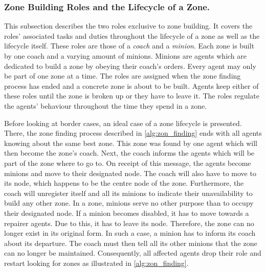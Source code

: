 \subsubsection{Zone Building Roles and the Lifecycle of a Zone.}\label{alg:zon_roles}
This subsection describes the two roles exclusive to zone building. It covers the roles' associated tasks and duties throughout the lifecycle of a zone as well as the lifecycle itself. These roles are those of a \emph{coach} and a \emph{minion}. Each zone is built by one coach and a varying amount of minions. Minions are agents which are dedicated to build a zone by obeying their coach's orders. Every agent may only be part of one zone at a time. %
The roles are assigned when the zone finding process has ended and a concrete zone is about to be built. Agents keep either of these roles until the zone is broken up or they have to leave it. The roles regulate the agents' behaviour throughout the time they spend in a zone.

Before looking at border cases, an ideal case of a zone lifecycle is presented. There, the zone finding process described in \autoref{alg:zon_finding} ends with all agents knowing about the same best zone. This zone was found by one agent which will then become the zone's coach. Next, the coach informs the agents which will be part of the zone where to go to. On receipt of this message, the agents become minions and move to their designated node. The coach will also have to move to its node, which happens to be the centre node of the zone. Furthermore, the coach will unregister itself and all its minions to indicate their unavailability to build any other zone.
In a zone, minions serve no other purpose than to occupy their designated node. If a minion becomes disabled, it has to move towards a repairer agents. Due to this, it has to leave its node. Therefore, the zone can no longer exist in its original form. In such a case, a minion has to inform its coach about its departure. The coach must then tell all its other minions that the zone can no longer be maintained. Consequently, all affected agents drop their role and restart looking for zones as illustrated in \autoref{alg:zon_finding}.

